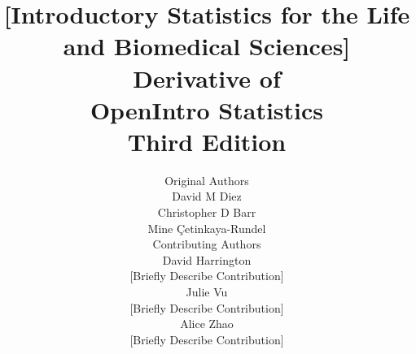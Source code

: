 

\title{\huge [Introductory Statistics for the Life and Biomedical Sciences] \\[2mm]
\large Derivative of \\
OpenIntro Statistics \\
Third Edition}
\author{\Large Original Authors \\[1.5mm]
\normalsize David M Diez \\
\normalsize Christopher D Barr \\
\normalsize Mine \c{C}etinkaya-Rundel \\[8mm]
\Large Contributing Authors \\[1.5mm]
\normalsize David Harrington \\
\small [Briefly Describe Contribution] \\[2mm]
\normalsize Julie Vu \\
\small [Briefly Describe Contribution] \\[2mm]
\normalsize Alice Zhao \\
\small [Briefly Describe Contribution] \\[2mm]
}


